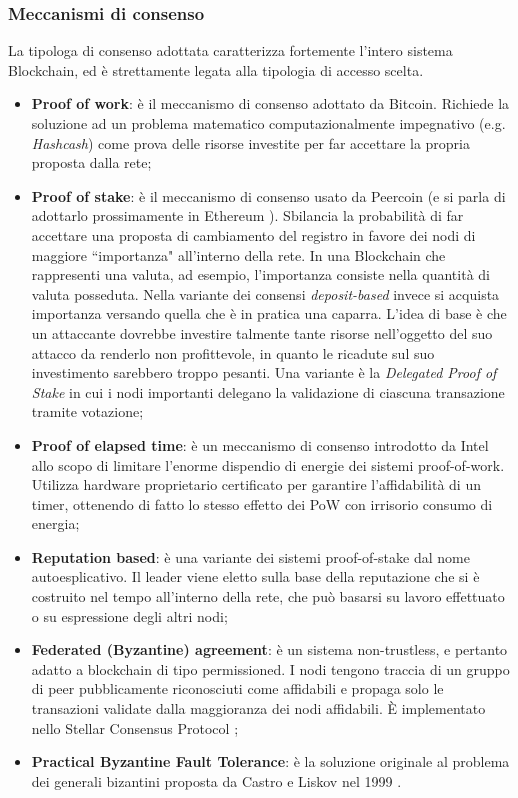		\subsubsection{Meccanismi di consenso}
			La tipologa di consenso adottata caratterizza fortemente l'intero sistema Blockchain, ed è strettamente legata alla tipologia di accesso scelta.
			\begin{itemize}
				\item \textbf{Proof of work}: è il meccanismo di consenso adottato da Bitcoin. Richiede la soluzione ad un problema matematico computazionalmente impegnativo (e.g. \emph{Hashcash}) come prova delle risorse investite per far accettare la propria proposta dalla rete;
				\item \textbf{Proof of stake}: è il meccanismo di consenso usato da Peercoin (e si parla di adottarlo prossimamente in Ethereum \cite{casper}). Sbilancia la probabilità di far accettare una proposta di cambiamento del registro in favore dei nodi di maggiore ``importanza" all'interno della rete. In una Blockchain che rappresenti una valuta, ad esempio, l'importanza consiste nella quantità di valuta posseduta. Nella variante dei consensi \emph{deposit-based} invece si acquista importanza versando quella che è in pratica una caparra. L'idea di base è che un attaccante dovrebbe investire talmente tante risorse nell'oggetto del suo attacco da renderlo non profittevole, in quanto le ricadute sul suo investimento sarebbero troppo pesanti. Una variante è la \emph{Delegated Proof of Stake} in cui i nodi importanti delegano la validazione di ciascuna transazione tramite votazione;
				\item \textbf{Proof of elapsed time}: è un meccanismo di consenso introdotto da Intel \cite{poet} allo scopo di limitare l'enorme dispendio di energie dei sistemi proof-of-work. Utilizza hardware proprietario certificato per garantire l'affidabilità di un timer, ottenendo di fatto lo stesso effetto dei PoW con irrisorio consumo di energia;
				\item \textbf{Reputation based}: è una variante dei sistemi proof-of-stake dal nome autoesplicativo. Il leader viene eletto sulla base della reputazione che si è costruito nel tempo all'interno della rete, che può basarsi su lavoro effettuato o su espressione degli altri nodi;
				\item \textbf{Federated (Byzantine) agreement}: è un sistema non-trustless, e pertanto adatto a blockchain di tipo permissioned. I nodi tengono traccia di un gruppo di peer pubblicamente riconosciuti come affidabili e propaga solo le transazioni validate dalla maggioranza dei nodi affidabili. È implementato nello Stellar Consensus Protocol \cite{stellar_protocol}; 
				\item \textbf{Practical Byzantine Fault Tolerance}: è la soluzione originale al problema dei generali bizantini proposta da Castro e Liskov nel 1999 \cite{PBFT}.
			\end{itemize}


